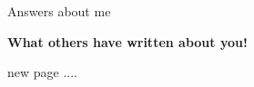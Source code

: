 \documentclass{uioposter}
\newcommand{\VAR}[1]{}
\newcommand{\BLOCK}[1]{}
\begin{document}
\begin{frame}[allowframebreaks]
    \vspace{1cm}
    \begin{exampleblock}{\faUser \hspace{0.5cm} Answers about me}
        \BLOCK{for ques,ans in student.AnswersAboutMyself}
        \textbf{\VAR{ques}}
        \newline \VAR{ans}
        \newline
        \BLOCK{endfor}

    \end{exampleblock}
    \vspace{-1cm}
    {\faUsers \hspace{0cm} \sffamily \bfseries \large What others have written about you!}
    
    \vspace{1cm}

    \BLOCK{for comment,fromWhom, newPage in student.CommentsIGet}
        \BLOCK{if newPage}
        \newpage
        \vspace*{5cm}
        new page ....
        \BLOCK{endif}

        \begin{block}{\hspace{0.5cm} \VAR{fromWhom}}
                \VAR{comment}
        \end{block}
    \BLOCK{endfor}
    
\end{frame}


\BLOCK{endfor}
\end{document}
